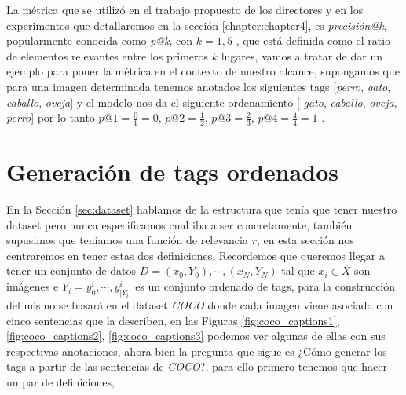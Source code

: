 La métrica que se utilizó en el trabajo propuesto de los directores y en los experimentos que detallaremos en la sección \ref{chapter:chapter4}, es \textit{precisión@k}, popularmente conocida como \textit{p@k}, con $k = 1, 5$ , que está definida como el ratio de elementos relevantes entre los primeros $k$ lugares, vamos a tratar de dar un ejemplo para poner la métrica en el contexto de nuestro alcance, supongamos que para una imagen determinada tenemos anotados los siguientes tags [\textit{perro}, \textit{gato}, \textit{caballo}, \textit{oveja}] y el modelo nos da el siguiente ordenamiento  [ \textit{gato}, \textit{caballo}, \textit{oveja}, \textit{perro}] por lo tanto $p@1 = \frac{0}{1}= 0$,   $p@2 =\frac{1}{2}$,  $p@3 = \frac{2}{3}$,  $p@4 = \frac{4}{4} = 1$ .

\section{Generación de tags ordenados} \label{seccion:tags_gen}

En la Sección \ref{sec:dataset} hablamos de la estructura que tenía que tener nuestro dataset pero nunca especificamos cual iba a ser concretamente, también supusimos que teníamos una función de relevancia $r$, en esta sección nos centraremos en tener estas dos definiciones.
Recordemos que queremos llegar a tener un conjunto de datos $D  = {(x_{0}, Y_{0}), \cdots , (x_{N}, Y_{N})}$ tal que $x_{i} \in X$ son imágenes e $Y_{i} = {y_{0}^{i}, \cdots, y_{|Y_{i}|}^{i}}$ es un conjunto ordenado de tags, para la construcción del mismo se basará en el dataset \textit{COCO} \cite{chen2015microsoft} donde cada imagen viene asociada con cinco sentencias que la describen, en las Figuras \ref{fig:coco_captions1}, \ref{fig:coco_captions2}, \ref{fig:coco_captions3} podemos ver algunas de ellas con sus respectivas anotaciones, ahora bien la pregunta que sigue es ¿Cómo generar los tags a partir de las sentencias de \textit{COCO}?, para ello primero tenemos que hacer un par de definiciones,

